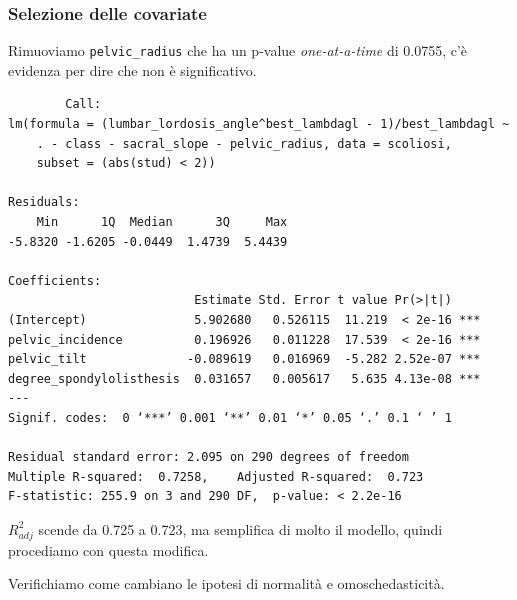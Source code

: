 \documentclass{beamer}
\begin{document}
\begin{frame}[fragile]
\frametitle{Selezione delle covariate}
	Rimuoviamo \texttt{pelvic\_radius} che ha un p-value \textit{one-at-a-time} di 0.0755, c'è evidenza per dire che non è significativo.

	{\tiny
	\begin{verbatim}
		Call:
lm(formula = (lumbar_lordosis_angle^best_lambdagl - 1)/best_lambdagl ~ 
    . - class - sacral_slope - pelvic_radius, data = scoliosi, 
    subset = (abs(stud) < 2))

Residuals:
    Min      1Q  Median      3Q     Max 
-5.8320 -1.6205 -0.0449  1.4739  5.4439 

Coefficients:
                          Estimate Std. Error t value Pr(>|t|)    
(Intercept)               5.902680   0.526115  11.219  < 2e-16 ***
pelvic_incidence          0.196926   0.011228  17.539  < 2e-16 ***
pelvic_tilt              -0.089619   0.016969  -5.282 2.52e-07 ***
degree_spondylolisthesis  0.031657   0.005617   5.635 4.13e-08 ***
---
Signif. codes:  0 ‘***’ 0.001 ‘**’ 0.01 ‘*’ 0.05 ‘.’ 0.1 ‘ ’ 1

Residual standard error: 2.095 on 290 degrees of freedom
Multiple R-squared:  0.7258,	Adjusted R-squared:  0.723 
F-statistic: 255.9 on 3 and 290 DF,  p-value: < 2.2e-16
	\end{verbatim}
	}
\end{frame}



\begin{frame}
	$R^2_{adj}$ scende da 0.725 a 0.723, ma semplifica di molto il modello, quindi procediamo con questa modifica.

	Verifichiamo come cambiano le ipotesi di normalità e omoschedasticità.
\end{frame}
\end{document}
